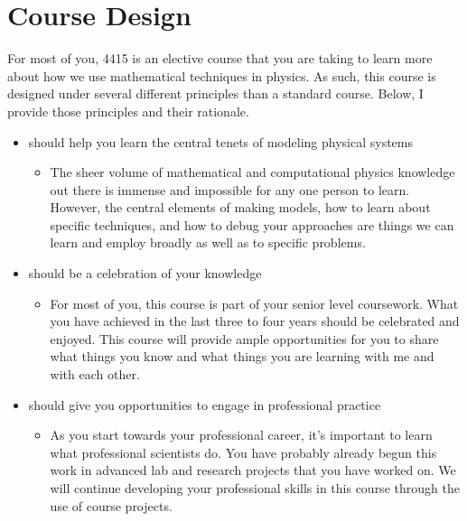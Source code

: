 \documentclass[letterpaper,10pt,english]{jupyterBook}
\begin{document}
\section{Course Design}
\label{\detokenize{content/0_course/design:course-design}}\label{\detokenize{content/0_course/design::doc}}
\sphinxAtStartPar
For most of you, 4415 is an elective course that you are taking to learn more about how we use mathematical techniques in physics. As such, this course is designed under several different principles than a standard course. Below, I provide those principles and their rationale.
\begin{itemize}
\item {} 
 should help you learn the central tenets of modeling physical systems
\begin{itemize}
\item {} 
\sphinxAtStartPar
The sheer volume of mathematical and computational physics knowledge out there is immense and impossible for any one person to learn. However, the central elements of making models, how to learn about specific techniques, and how to debug your approaches are things we can learn and employ broadly as well as to specific problems.

\end{itemize}

\item {} 
 should be a celebration of your knowledge
\begin{itemize}
\item {} 
\sphinxAtStartPar
For most of you, this course is part of your senior level coursework. What you have achieved in the last three to four years should be celebrated and enjoyed. This course will provide ample opportunities for you to share what things you know and what things you are learning with me and with each other.

\end{itemize}

\item {} 
 should give you opportunities to engage in professional practice
\begin{itemize}
\item {} 
\sphinxAtStartPar
As you start towards your professional career, it’s important to learn what professional scientists do. You have probably already begun this work in advanced lab and research projects that you have worked on. We will continue developing your professional skills in this course through the use of course projects.


\end{itemize}
\end{itemize}
\end{document}
